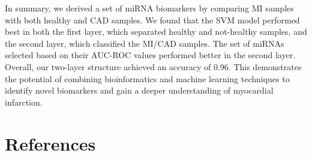 \documentclass[
]{article}
\begin{document}
In summary, we derived a set of miRNA biomarkers by comparing MI samples
with both healthy and CAD samples. We found that the SVM model performed
best in both the first layer, which separated healthy and not-healthy
samples, and the second layer, which classified the MI/CAD samples. The
set of miRNAs selected based on their AUC-ROC values performed better in
the second layer. Overall, our two-layer structure achieved an accuracy
of 0.96. This demonstrates the potential of combining bioinformatics and
machine learning techniques to identify novel biomarkers and gain a
deeper understanding of myocardial infarction.

\hypertarget{references}{%
\section*{References}\label{references}}
\end{document}

